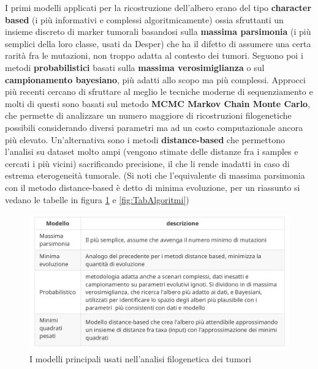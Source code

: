 \documentclass[a4paper]{article}
\begin{document}
	I primi modelli applicati per la ricostruzione dell'albero erano del tipo \textbf{character based} (i più informativi e complessi algoritmicamente) ossia
	sfruttanti un insieme discreto di marker tumorali basandosi sulla \textbf{massima parsimonia} (i più semplici
	della loro classe, usati da Desper) che ha il difetto di assumere una certa rarità fra le mutazioni, non troppo adatta
	al contesto dei tumori. Seguono poi i metodi \textbf{probabilistici} basati sulla \textbf{massima verosimiglianza} o sul
	\textbf{campionamento bayesiano}, più adatti allo scopo ma più complessi. Approcci più recenti cercano di
	sfruttare al meglio le tecniche moderne di sequenziamento e molti di questi sono basati sul metodo \textbf{MCMC Markov Chain Monte Carlo}, che permette di analizzare un numero maggiore di ricostruzioni
	filogenetiche possibili considerando diversi parametri ma ad un costo computazionale ancora più elevato.
	Un'alternativa sono i metodi \textbf{distance-based} che permettono l'analisi su dataset molto ampi (vengono
	stimate delle distanze fra i samples e cercati i più vicini) sacrificando precisione, il che li rende inadatti in caso di estrema eterogeneità tumorale.
	(Si noti che l'equivalente di massima parsimonia con il metodo distance-based è detto di minima evoluzione, per un riassunto si vedano le tabelle in 
	figura \ref{fig:TabModelli} e \ref{fig:TabAlgoritmi})

	\begin{figure}[h]
	  \centering
	  \includegraphics[scale=0.3, keepaspectratio]{TabModelli.png}%
	  \captionsetup{justification=centering,margin=0.5cm}
	  \caption{I modelli principali usati nell'analisi filogenetica dei tumori} \label{fig:TabModelli}
	\end{figure}
\end{document}
